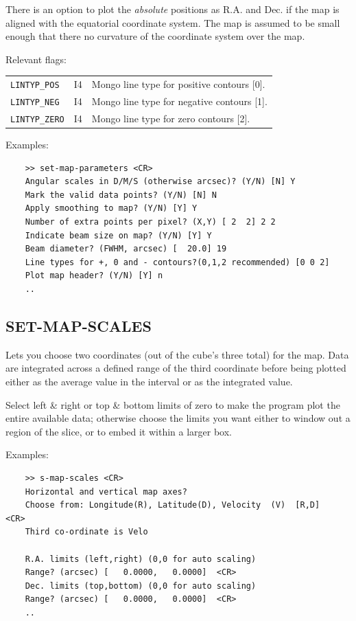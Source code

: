 \documentclass[11pt,twoside]{report}
\begin{document}
There is an option to plot the {\em absolute} positions as R.A. and Dec. if
the map is aligned with the equatorial coordinate system. The map is assumed
to be small enough that there no curvature of the coordinate system over the
map.

Relevant flags:\\
\begin{tabular}{lll}
  \verb+LINTYP_POS+   & I4 & Mongo line type for positive contours [0].\\
  \verb+LINTYP_NEG+   & I4 & Mongo line type for negative contours [1].\\
  \verb+LINTYP_ZERO+  & I4 & Mongo line type for zero contours [2].
\end{tabular}

Examples:
\begin{verbatim}
    >> set-map-parameters <CR>
    Angular scales in D/M/S (otherwise arcsec)? (Y/N) [N] Y
    Mark the valid data points? (Y/N) [N] N
    Apply smoothing to map? (Y/N) [Y] Y
    Number of extra points per pixel? (X,Y) [ 2  2] 2 2
    Indicate beam size on map? (Y/N) [Y] Y
    Beam diameter? (FWHM, arcsec) [  20.0] 19
    Line types for +, 0 and - contours?(0,1,2 recommended) [0 0 2]
    Plot map header? (Y/N) [Y] n
    ..
\end{verbatim}


\subsection{SET-MAP-SCALES} 

Lets you choose two coordinates (out of the cube's three total) for the map.
Data are integrated across a defined range of the third coordinate before 
being plotted either as the average value in the interval or as the 
integrated value.

Select left \& right or top \& bottom limits of zero to make the program plot
the entire available data; otherwise choose the limits you want either to
window out a region of the slice, or to embed it within a larger box. 

Examples:
\begin{verbatim}
    >> s-map-scales <CR>
    Horizontal and vertical map axes?
    Choose from: Longitude(R), Latitude(D), Velocity  (V)  [R,D]    <CR>
    Third co-ordinate is Velo

    R.A. limits (left,right) (0,0 for auto scaling)
    Range? (arcsec) [   0.0000,   0.0000]  <CR>
    Dec. limits (top,bottom) (0,0 for auto scaling)
    Range? (arcsec) [   0.0000,   0.0000]  <CR>
    ..
\end{verbatim}
\end{document}
